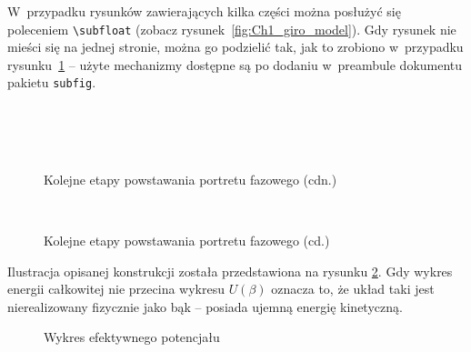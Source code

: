 {\red
  W~przypadku rysunków zawierających kilka części można posłużyć się poleceniem \texttt{\textbackslash subfloat} (zobacz rysunek~\ref{fig:Ch1_giro_model}). Gdy rysunek nie mieści się na jednej stronie, można go podzielić tak, jak to zrobiono w~przypadku rysunku~\ref{fig:portret_fazowy_step} -- użyte mechanizmy dostępne są po dodaniu w~preambule dokumentu pakietu \texttt{subfig}.}
\begin{figure}[tp]
  \centering
  \def\svgscale{0.87}\subfloat[]{}
  \def\svgscale{0.87}\subfloat[]{}\\ 
  \def\svgscale{0.85}\subfloat[]{}
  \def\svgscale{0.85}\subfloat[]{}\\ 
  \def\svgscale{0.83}\subfloat[]{}
  \def\svgscale{0.83}\subfloat[]{}\\ 
  \caption{Kolejne etapy powstawania portretu fazowego (cdn.)}
  \label{fig:portret_fazowy_step}
\end{figure}
\begin{figure}
  \centering
  \ContinuedFloat
  \def\svgscale{0.81}\subfloat[]{}
  \def\svgscale{0.81}\subfloat[]{}\\ 
  \def\svgscale{0.77}\subfloat[]{} 
  \caption{Kolejne etapy powstawania portretu fazowego (cd.)}
\end{figure}

\noindent
[\ldots]

\noindent
Ilustracja opisanej konstrukcji została przedstawiona na rysunku \ref{fig:efekt_poten}. Gdy wykres energii całkowitej nie przecina wykresu $U(\beta)$ oznacza to, że układ taki jest nierealizowany fizycznie jako bąk -- posiada ujemną energię kinetyczną.
\begin{figure}[tp]
    \centering
    \def\svgscale{0.8}
    
    \caption{Wykres efektywnego potencjału}
    \label{fig:efekt_poten}
\end{figure}

\noindent
[\ldots]

